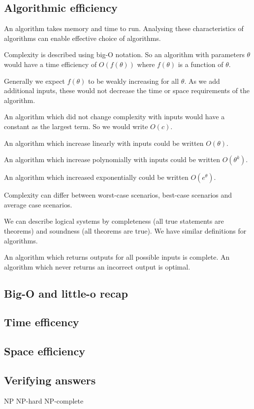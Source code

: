 
\subsection{Algorithmic efficiency}

An algorithm takes memory and time to run. Analysing these characteristics of algorithms can enable effective choice of algorithms.

Complexity is described using big-O notation. So an algorithm with parameters \(\theta \) would have a time efficiency of \(O(f(\theta ))\) where \(f(\theta )\) is a function of \(\theta \).

Generally we expect \(f(\theta )\) to be weakly increasing for all \(\theta \). As we add additional inputs, these would not decrease the time or space requirements of the algorithm.

An algorithm which did not change complexity with inputs would have a constant as the largest term. So we would write \(O(c)\).

An algorithm which increase linearly with inputs could be written \(O(\theta )\).

An algorithm which increase polynomially with inputs could be written \(O(\theta ^k)\).

An algorithm which increased exponentially could be written \(O(e^\theta )\).

Complexity can differ between worst-case scenarios, best-case scenarios and average case scenarios.

We can describe logical systems by completeness (all true statements are theorems) and soundness (all theorems are true). We have similar definitions for algorithms.

An algorithm which returns outputs for all possible inputs is complete. An algorithm which never returns an incorrect output is optimal.

\subsection{Big-O and little-o recap}

\subsection{Time efficency}

\subsection{Space efficiency}

\subsection{Verifying answers}

NP
NP-hard
NP-complete
